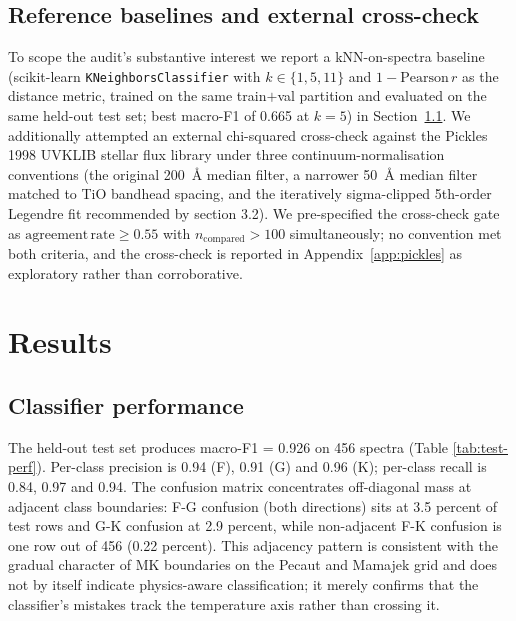 \documentclass[11pt,a4paper]{article}
\begin{document}
\subsection{Reference baselines and external cross-check}
\label{subsec:baselines}

To scope the audit's substantive interest we report a kNN-on-spectra baseline (scikit-learn \texttt{KNeighborsClassifier} with $k \in \{1, 5, 11\}$ and $1 - \mathrm{Pearson}\,r$ as the distance metric, trained on the same train$+$val partition and evaluated on the same held-out test set; best macro-F1 of 0.665 at $k = 5$) in Section~\ref{subsec:perf}. We additionally attempted an external chi-squared cross-check against the Pickles 1998 UVKLIB stellar flux library \citep{1998PASP..110..863P} under three continuum-normalisation conventions (the original 200~\AA{} median filter, a narrower 50~\AA{} median filter matched to TiO bandhead spacing, and the iteratively sigma-clipped 5th-order Legendre fit recommended by \citet{1998PASP..110..863P} section 3.2). We pre-specified the cross-check gate as $\mathrm{agreement\,rate} \geq 0.55$ with $n_{\mathrm{compared}} > 100$ simultaneously; no convention met both criteria, and the cross-check is reported in Appendix~\ref{app:pickles} as exploratory rather than corroborative.

\section{Results}
\label{sec:results}

\subsection{Classifier performance}
\label{subsec:perf}

The held-out test set produces macro-F1 = 0.926 on 456 spectra (Table \ref{tab:test-perf}). Per-class precision is 0.94 (F), 0.91 (G) and 0.96 (K); per-class recall is 0.84, 0.97 and 0.94. The confusion matrix concentrates off-diagonal mass at adjacent class boundaries: F-G confusion (both directions) sits at 3.5 percent of test rows and G-K confusion at 2.9 percent, while non-adjacent F-K confusion is one row out of 456 (0.22 percent). This adjacency pattern is consistent with the gradual character of MK boundaries on the Pecaut and Mamajek grid and does not by itself indicate physics-aware classification; it merely confirms that the classifier's mistakes track the temperature axis rather than crossing it.
\end{document}
